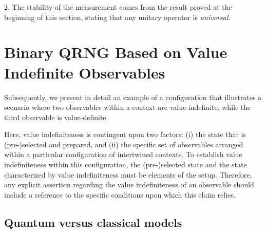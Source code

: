 \documentclass[%
 superscriptaddress,
  preprint,
 showpacs,
 showkeys,
 nofootinbib,
  amsmath,amssymb,
  aps,
 pra,
  longbibliography,
  floatfix,
 ]{revtex4-2}
\theoremstyle{definition}
\begin{document}
2. The stability of the measurement comes from the result proved at the beginning of this section, stating that any unitary operator is {\it universal}.


\section{Binary QRNG Based on Value Indefinite Observables}
\label{2023-viext-qrngdefs}

Subsequently, we present in detail an example of a configuration that illustrates a scenario where two observables within a context are value-indefinite, while the third observable is value-definite.

Here, value indefiniteness is contingent upon two factors:
(i) the state that is (pre-)selected and prepared, and
(ii) the specific set of observables arranged within a particular configuration of intertwined contexts.
To establish value indefiniteness within this configuration, the (pre-)selected state and the state characterized by value indefiniteness must be elements of the setup.
Therefore, any explicit assertion regarding the value indefiniteness of an observable should include a reference to the specific conditions upon which this claim relies.

\subsection{Quantum versus classical models}
\end{document}

